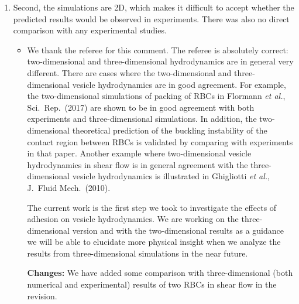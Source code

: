 \documentclass[11pt]{article}
\newcommand{\comment}[1]{{\color{blue} #1}}
\begin{document}
\begin{enumerate}
\begin{itemize}
{\bf Changes:} We made revisions with this comment in mind, to make sure
that our results are highlighted and the readers can see clearly how
these results are unique and maybe useful.
  
  
\end{itemize}

\noindent
\item \comment{Second, the simulations are 2D, which makes it difficult
  to accept whether the predicted results would be observed in
  experiments. There was also no direct comparison with any experimental
  studies.}
\begin{itemize}
  \item We thank the referee for this comment. The referee is absolutely
    correct: two-dimensional and three-dimensional hydrodynamics are in
    general very different. There are cases where the two-dimensional
    and three-dimensional vesicle hydrodynamics are in good agreement.
    For example, the two-dimensional simulations of packing of RBCs in
    Flormann {\em et al.}, Sci.~Rep.~(2017) are shown to be in good
    agreement with both experiments and three-dimensional simulations.
    In addition, the two-dimensional theoretical prediction of the
    buckling instability of the contact region between RBCs is validated
    by comparing with experiments in that paper.  Another example where
    two-dimensional vesicle hydrodynamics in shear flow is in general
    agreement with the three-dimensional vesicle hydrodynamics is
    illustrated in Ghigliotti {\em et al.}, J.~Fluid Mech.~(2010). 
  
  The current work is the first step we took to investigate the effects
    of adhesion on vesicle hydrodynamics. We are working on the
    three-dimensional version and with the two-dimensional results as a
    guidance we will be able to elucidate more physical insight when we
    analyze the results from three-dimensional simulations in the near
    future.
  
  \noindent
  {\bf Changes:} We have added some comparison with three-dimensional
    (both numerical and experimental) results of two RBCs in shear flow
    in the revision.
\end{itemize}


\end{enumerate}
\end{document}
